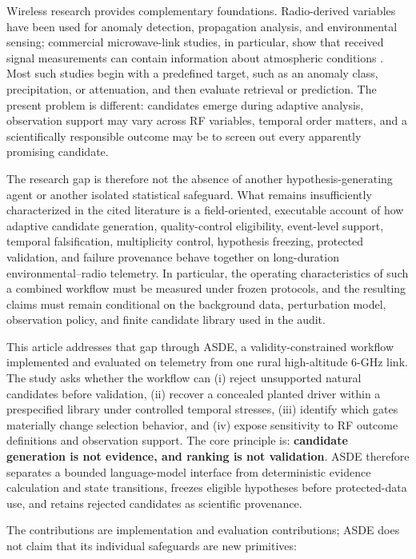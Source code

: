 \documentclass{ieeeaccess}
\begin{document}
Wireless research provides complementary foundations. Radio-derived variables have been used for anomaly detection, propagation analysis, and environmental sensing; commercial microwave-link studies, in particular, show that received signal measurements can contain information about atmospheric conditions \cite{RADIO-DT-2025,MESSER-2006,LEIJNSE-2007,UIJLENHOET-2018}. Most such studies begin with a predefined target, such as an anomaly class, precipitation, or attenuation, and then evaluate retrieval or prediction. The present problem is different: candidates emerge during adaptive analysis, observation support may vary across RF variables, temporal order matters, and a scientifically responsible outcome may be to screen out every apparently promising candidate.

The research gap is therefore not the absence of another hypothesis-generating agent or another isolated statistical safeguard. What remains insufficiently characterized in the cited literature is a field-oriented, executable account of how adaptive candidate generation, quality-control eligibility, event-level support, temporal falsification, multiplicity control, hypothesis freezing, protected validation, and failure provenance behave together on long-duration environmental--radio telemetry. In particular, the operating characteristics of such a combined workflow must be measured under frozen protocols, and the resulting claims must remain conditional on the background data, perturbation model, observation policy, and finite candidate library used in the audit.

This article addresses that gap through ASDE, a validity-constrained workflow implemented and evaluated on telemetry from one rural high-altitude 6-GHz link. The study asks whether the workflow can (i) reject unsupported natural candidates before validation, (ii) recover a concealed planted driver within a prespecified library under controlled temporal stresses, (iii) identify which gates materially change selection behavior, and (iv) expose sensitivity to RF outcome definitions and observation support. The core principle is: \textbf{candidate generation is not evidence, and ranking is not validation}. ASDE therefore separates a bounded language-model interface from deterministic evidence calculation and state transitions, freezes eligible hypotheses before protected-data use, and retains rejected candidates as scientific provenance.

The contributions are implementation and evaluation contributions; ASDE does not claim that its individual safeguards are new primitives:
\end{document}
